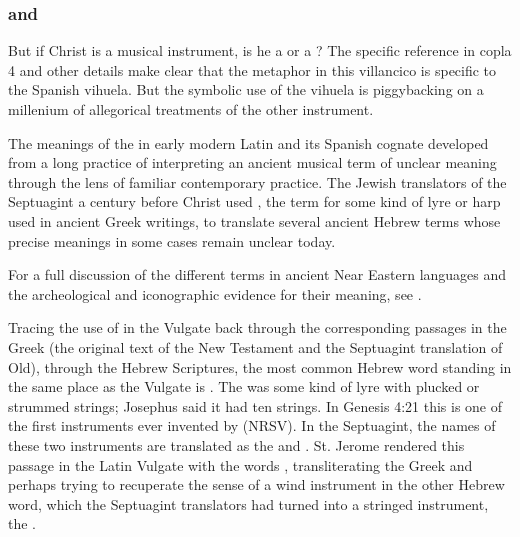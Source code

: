 \subsubsection{ and }

But if Christ is a musical instrument, is he a  or a
?  
The specific reference in copla 4 and other details make clear that the
metaphor in this villancico is specific to the Spanish 
vihuela.
But the symbolic use of the vihuela is piggybacking on a millenium of
allegorical treatments of the other instrument.

The meanings of the  in early modern Latin and its Spanish
cognate  developed from a long practice of interpreting an ancient
musical term of unclear meaning through the lens of familiar contemporary
practice.
The Jewish translators of the Septuagint a century before Christ used
, the term for some kind of lyre or harp used in ancient Greek
writings, to translate several ancient Hebrew terms whose precise meanings in
some cases remain unclear today.%
\begin{Footnote} 
    For a full discussion of the different terms in ancient Near Eastern
    languages and the archeological and iconographic evidence for their
    meaning, see \autocite{Lawergren:Lyres}.
\end{Footnote}
Tracing the use of  in the Vulgate back through the corresponding
passages in the Greek (the original text of the New Testament and the
Septuagint translation of Old), through the Hebrew Scriptures, the most common
Hebrew word standing in the same place as the Vulgate  is
.
The  was some kind of lyre with plucked or strummed strings;
Josephus said it had ten strings.%
    \Autocite[]{Bromily:BibleEncyclopedia}
In Genesis 4:21 this is one of the first instruments ever invented by
 (NRSV).
In the Septuagint, the names of these two instruments are translated as the
 and .
St. Jerome rendered this passage in the Latin Vulgate with the words
, transliterating the Greek  and
perhaps trying to recuperate the sense of a wind instrument in the other Hebrew
word, which the Septuagint translators had turned into a stringed instrument,
the .

